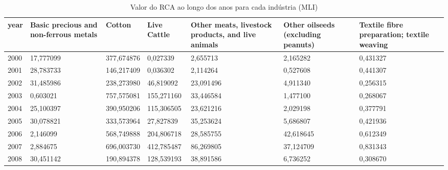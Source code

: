 \begin{table}
\centering
\caption{Valor do RCA ao longo dos anos para cada indústria (MLI)}
\begin{tabular}{p{1cm}p{2cm}p{2cm}p{2cm}p{2cm}p{2cm}p{2cm}}
\toprule
 year &  Basic precious and non-ferrous metals &     Cotton &  Live Cattle &  Other meats, livestock products, and live animals &  Other oilseeds (excluding peanuts) &  Textile fibre preparation; textile weaving \\
\midrule
 2000 &                              17,777099 & 377,674876 &     0,027339 &                                           2,655713 &                            2,165282 &                                    0,431327 \\
 2001 &                              28,783733 & 146,217409 &     0,036302 &                                           2,114264 &                            0,527608 &                                    0,441307 \\
 2002 &                              31,485986 & 238,273980 &    46,819092 &                                          23,091496 &                            4,911340 &                                    0,256315 \\
 2003 &                               0,603021 & 757,575081 &   155,271160 &                                          33,446584 &                            1,477100 &                                    0,268067 \\
 2004 &                              25,100397 & 390,950206 &   115,306505 &                                          23,621216 &                            2,029198 &                                    0,377791 \\
 2005 &                              30,078821 & 333,573964 &    27,827839 &                                          35,253624 &                            5,686807 &                                    0,421936 \\
 2006 &                               2,146099 & 568,749888 &   204,806718 &                                          28,585755 &                           42,618645 &                                    0,612349 \\
 2007 &                               2,884675 & 696,003730 &   412,785487 &                                          86,269805 &                           37,124709 &                                    0,831343 \\
 2008 &                              30,451142 & 190,894378 &   128,539193 &                                          38,891586 &                            6,736252 &                                    0,308670 \\

\end{tabular}
\end{table}
